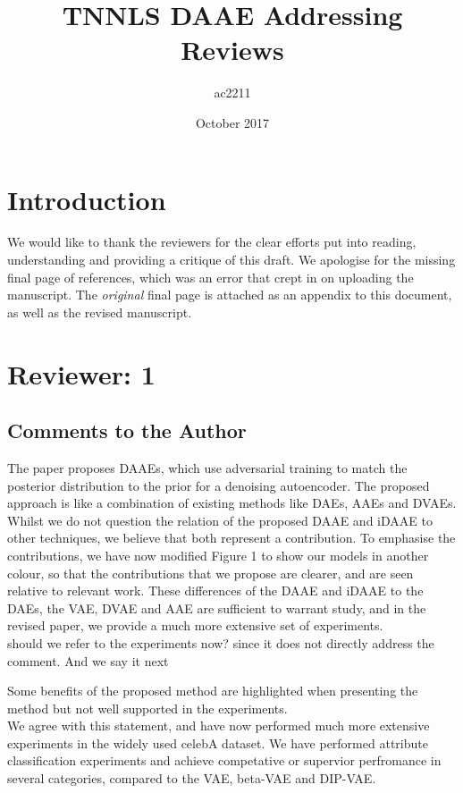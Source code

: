 \documentclass{article}
\title{TNNLS DAAE Addressing Reviews}
\author{ac2211 }
\date{October 2017}
\begin{document}
\maketitle
\section*{Introduction}
We would like to thank the reviewers for the clear efforts put into reading, understanding and providing a critique of this draft. We apologise for the missing final page of references, which was an error that crept in on uploading the manuscript.  The {\em original} final page is attached as an appendix to this document, as well as the revised manuscript. \\

\section*{Reviewer: 1}
\subsection*{Comments to the Author}
{\color{blue} The paper proposes DAAEs, which use adversarial training to match the posterior distribution to the prior for a denoising autoencoder. The proposed approach is like a combination of existing methods like DAEs, AAEs and DVAEs.}\\

Whilst we do not question the relation of the proposed DAAE and iDAAE to other techniques, we believe that both represent a contribution.  To emphasise the contributions, we have now modified Figure 1 {\color{red} to show our models in another colour, } so that the contributions that we propose are clearer, and are seen relative to relevant work.  These differences of the DAAE and iDAAE to the DAEs, the VAE, DVAE and AAE are sufficient to warrant study, and in the revised paper, we provide a much more extensive set of experiments.\\

{\color{red} should we refer to the experiments now? since it does not directly address the comment. And we say it next}

{\color{blue} Some benefits of the proposed method are highlighted when presenting the method but not well supported in the experiments. }\\

We agree with this statement, and have now performed much more extensive experiments in the widely used celebA dataset. {\color{red} We have performed attribute classification experiments and achieve competative or supervior perfromance in several categories, compared to the VAE, beta-VAE and DIP-VAE.}\\
\end{document}

